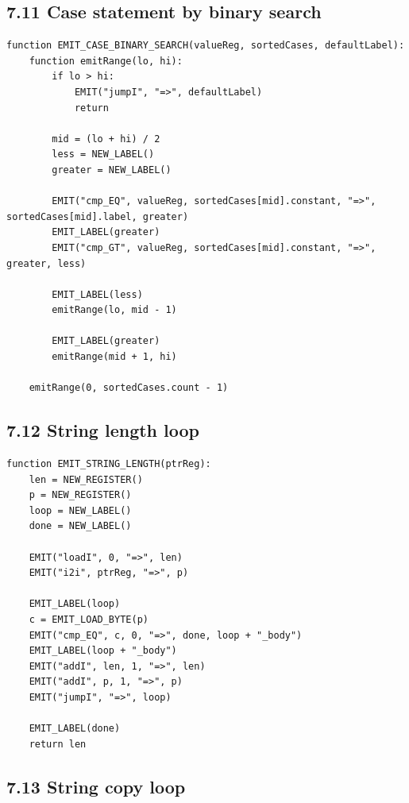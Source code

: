 \documentclass[10pt,letterpaper]{article}
\begin{document}
\subsection*{7.11 Case statement by binary search}
{}

\begin{verbatim}
function EMIT_CASE_BINARY_SEARCH(valueReg, sortedCases, defaultLabel):
    function emitRange(lo, hi):
        if lo > hi:
            EMIT("jumpI", "=>", defaultLabel)
            return

        mid = (lo + hi) / 2
        less = NEW_LABEL()
        greater = NEW_LABEL()

        EMIT("cmp_EQ", valueReg, sortedCases[mid].constant, "=>", sortedCases[mid].label, greater)
        EMIT_LABEL(greater)
        EMIT("cmp_GT", valueReg, sortedCases[mid].constant, "=>", greater, less)

        EMIT_LABEL(less)
        emitRange(lo, mid - 1)

        EMIT_LABEL(greater)
        emitRange(mid + 1, hi)

    emitRange(0, sortedCases.count - 1)
\end{verbatim}

\subsection*{7.12 String length loop}
{}

\begin{verbatim}
function EMIT_STRING_LENGTH(ptrReg):
    len = NEW_REGISTER()
    p = NEW_REGISTER()
    loop = NEW_LABEL()
    done = NEW_LABEL()

    EMIT("loadI", 0, "=>", len)
    EMIT("i2i", ptrReg, "=>", p)

    EMIT_LABEL(loop)
    c = EMIT_LOAD_BYTE(p)
    EMIT("cmp_EQ", c, 0, "=>", done, loop + "_body")
    EMIT_LABEL(loop + "_body")
    EMIT("addI", len, 1, "=>", len)
    EMIT("addI", p, 1, "=>", p)
    EMIT("jumpI", "=>", loop)

    EMIT_LABEL(done)
    return len
\end{verbatim}

\subsection*{7.13 String copy loop}
{}
\end{document}
